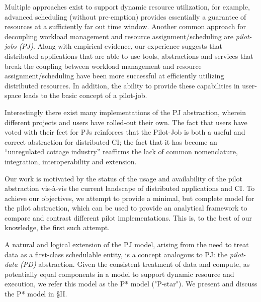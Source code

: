 \documentclass[conference,final]{IEEEtran}
\newcommand{\jhanote}[1]{ {\textcolor{red} { ***shantenu: #1 }}}
\newcommand{\alnote}[1]{ {\textcolor{blue} { ***andre: #1 }}}
\newcommand{\alnote}[1]{}
\newcommand{\jhanote}[1]{}
\begin{document}
Multiple approaches exist to support dynamic resource utilization, for
example, advanced scheduling (without pre-emption) provides
essentially a guarantee of resources %
at a sufficiently far out time window.  Another common approach for
decoupling workload management and resource assignment/scheduling are
\emph{pilot-jobs (PJ)}. Along with empirical evidence, our experience
suggests that distributed applications that are able to use tools,
abstractions and services that break the coupling between workload
management and resource assignment/scheduling have been more
successful at efficiently utilizing distributed resources. In
addition, the ability to provide these capabilities in user-space
leads to the basic concept of a pilot-job.


Interestingly there exist many implementations of the PJ
abstraction, wherein different projects and users have rolled-out
their own. The fact that users have voted with their feet for
PJs reinforces that the Pilot-Job is both a useful
and correct abstraction for distributed CI; the fact
that it has become an ``unregulated cottage industry'' reaffirms the
lack of common nomenclature, integration, interoperability and
extension.

Our work is
motivated by the status of the usage and availability of the pilot
abstraction vis-\`{a}-vis the current landscape of distributed
applications and CI.  To achieve our objectives, we 
attempt to provide a minimal, but complete model for the pilot
abstraction, which can be used to provide an analytical
framework to compare and contrast different pilot
implementations. This is, to the best of our knowledge, the first such
attempt.

A natural and logical extension of the PJ model, arising from the need
to treat data as a first-class schedulable entity, is a concept
analogous to PJ: the \emph{pilot-data (PD)} abstraction. Given the
consistent treatment of data and compute, as potentially equal
components in a model to support dynamic resource and execution,
we refer this model as the P* model ("P-star"). We present and discuss
the P* model in \S{II}.
\end{document}
